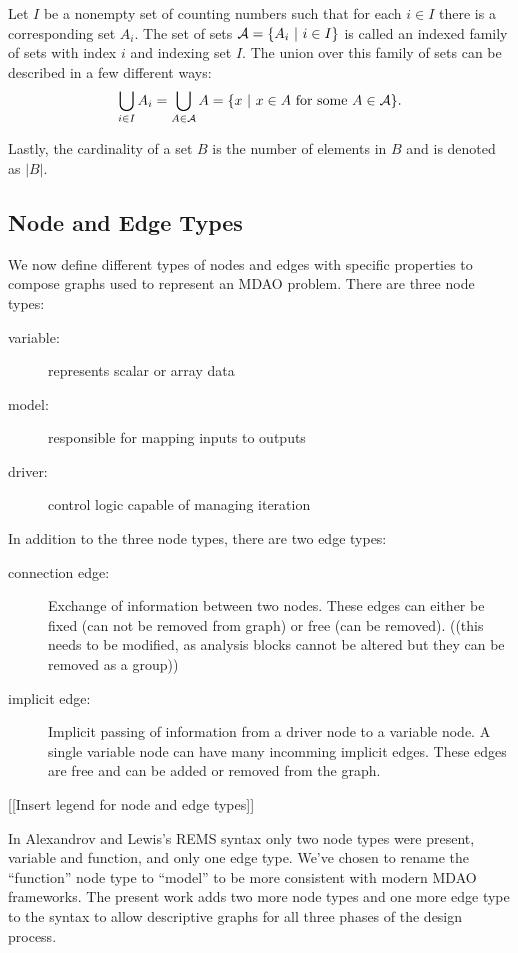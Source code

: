	Let $I$ be a nonempty set of counting numbers such that for each $i \in I$ there is a corresponding set $A_i$. 
	The set of sets $\mathcal A = \{A_i \ | \  i \in I\}$ is called an indexed family of sets with index $i$ and 
	indexing set $I$\cite{smith2006}. 
	The union over this family of sets can be described in a few different ways:
	\begin{equation}
	\bigcup_{i \in I} A_i = \bigcup_{A \in \mathcal A} A = \{x \ | \  x \in A \textrm{ for some } A \in \mathcal A\}.
	\end{equation}

	Lastly, the cardinality of a set $B$ is the number of elements in $B$ and is denoted as $|B|$.

\subsection{Node and Edge Types}
	\label{ss:types}
	We now define different types of nodes and edges with specific properties to compose graphs used to represent an MDAO problem. 
	There are three node types:  
	\begin{description}
	\item[variable: ] represents scalar or array data
	\item[model:] responsible for mapping inputs to outputs
	\item[driver:] control logic capable of managing iteration
	\end{description}

	In addition to the three node types, there are two edge types: 

	\begin{description}
	\item[connection edge:] Exchange of information between two nodes. These edges 
	can either be fixed (can not be removed from graph) or free (can be removed). ((this needs to be modified, as analysis blocks cannot be altered but they can be removed as a group))
	\item [implicit edge:] Implicit passing of information from a driver node to a 
	  variable node. A single variable node can have many incomming implicit edges. These edges are 
	  free and can be added or removed from the graph. 
	\end{description}

	[[Insert legend for node and edge types]]

	In Alexandrov and Lewis's REMS syntax only two node types were present, variable 
	and function, and only one edge type\cite{alexandrov2004}. We've chosen to rename the ``function'' node 
	type to ``model'' to be more consistent with modern MDAO frameworks. The present work 
	adds two more node types and one more edge type to the syntax to allow descriptive
	graphs for all three phases of the design process. 

